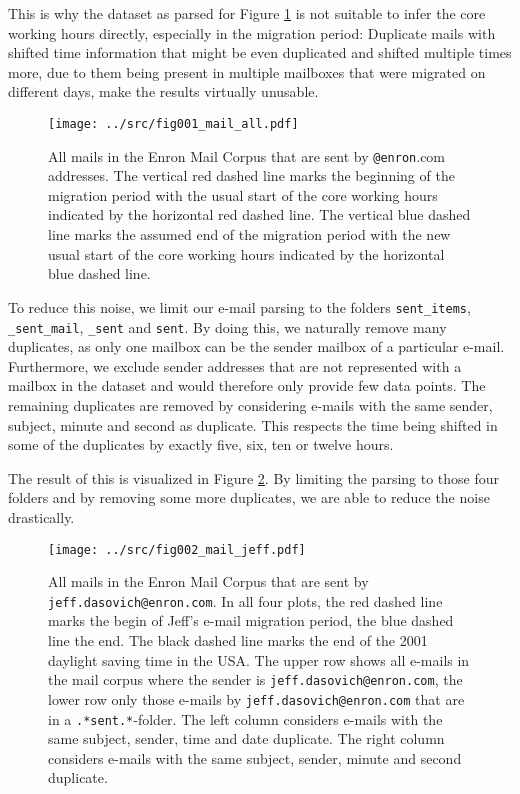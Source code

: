 \documentclass{article}
\begin{document}
This is why the dataset as parsed for Figure \ref{fig:allmail} is not suitable
to infer the core working hours directly, especially in the migration period:
Duplicate mails with shifted time information that might be even duplicated and
shifted multiple times more, due to them being present in multiple mailboxes
that were migrated on different days, make the results virtually unusable.

\begin{figure}
  \centering
  \texttt{[image: ../src/fig001\_mail\_all.pdf]}
   \caption{All mails in the Enron Mail Corpus that are sent by
  \texttt{@enron}.com addresses. The vertical red dashed line marks the beginning of
  the migration period with the usual start of the core working hours indicated
  by the horizontal red dashed line. The vertical blue dashed line marks the
  assumed end of the migration period with the new usual start of the core
  working hours indicated by the horizontal blue dashed line.}
  \label{fig:allmail}
  \vspace{-4mm}
\end{figure}

To reduce this noise, we limit our e-mail parsing to the folders
\texttt{sent\_items}, \texttt{\_sent\_mail}, \texttt{\_sent} and \texttt{sent}.
By doing this, we naturally remove many duplicates, as only one mailbox can be
the sender mailbox of a particular e-mail. Furthermore, we exclude sender
addresses that are not represented with a mailbox in the dataset and would
therefore only provide few data points. The remaining duplicates are removed by
considering e-mails with the same sender, subject, minute and second as
duplicate. This respects the time being shifted in some of the duplicates by
exactly five, six, ten or twelve hours.

The result of this is visualized in Figure \ref{fig:jeffmail}. By limiting the
parsing to those four folders and by removing some more duplicates, we are able
to reduce the noise drastically.

\begin{figure}
  \centering
  \texttt{[image: ../src/fig002\_mail\_jeff.pdf]}
  \label{fig:jeffmail}
  \caption{All mails in the Enron Mail Corpus that are sent by
  \texttt{jeff.dasovich@enron.com}. In all four plots, the red dashed line marks
  the begin of Jeff's e-mail migration period, the blue dashed line the end. The
  black dashed line marks the end of the 2001 daylight saving time in the USA.
  The upper row shows all e-mails in the mail corpus where the sender is
  \texttt{jeff.dasovich@enron.com}, the lower row only those e-mails by
  \texttt{jeff.dasovich@enron.com} that are in a \texttt{.*sent.*}-folder. The
  left column considers e-mails with the same subject, sender, time and date
  duplicate. The right column considers e-mails with the same subject, sender,
  minute and second duplicate.}
\end{figure}
\end{document}

